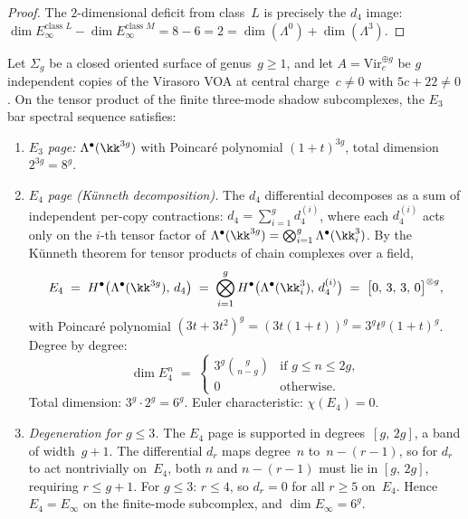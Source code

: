 \begin{proof}
The $2$-dimensional deficit from class~$L$ is precisely the $d_4$ image: $\dim E_\infty^{\text{class }L} - \dim E_\infty^{\text{class }M} = 8 - 6 = 2 = \dim(\Lambda^0) + \dim(\Lambda^3)$.
\end{proof}

\begin{corollary}
\label{cor:class-m-higher-genus}
Let $\Sigma_g$ be a closed oriented surface of genus~$g \geq 1$, and let $A = \mathrm{Vir}_c^{\oplus g}$ be $g$ independent copies of the Virasoro VOA at central charge~$c \neq 0$ with $5c + 22 \neq 0$. On the tensor product of the finite three-mode shadow subcomplexes, the $E_3$ bar spectral sequence satisfies:
\begin{enumerate}[label=\textup{(\roman*)}]
 \item \emph{$E_3$ page:} $\Lambda^\bullet(\kk^{3g})$ with Poincar\'{e} polynomial $(1+t)^{3g}$, total dimension~$2^{3g} = 8^g$.

 \item \emph{$E_4$ page (K\"{u}nneth decomposition).} The $d_4$ differential decomposes as a sum of independent per-copy contractions: $d_4 = \sum_{i=1}^g d_4^{(i)}$, where each $d_4^{(i)}$ acts only on the $i$-th tensor factor of $\Lambda^\bullet(\kk^{3g}) = \bigotimes_{i=1}^g \Lambda^\bullet(\kk^3_i)$. By the K\"{u}nneth theorem for tensor products of chain complexes over a field,
 \[
 E_4 \;=\; H^\bullet\bigl(\Lambda^\bullet(\kk^{3g}),\, d_4\bigr) \;=\; \bigotimes_{i=1}^g H^\bullet\bigl(\Lambda^\bullet(\kk^3_i),\, d_4^{(i)}\bigr) \;=\; \bigl[0,\, 3,\, 3,\, 0\bigr]^{\otimes g},
 \]
 with Poincar\'{e} polynomial $(3t + 3t^2)^g = (3t(1+t))^g = 3^g t^g (1+t)^g$. Degree by degree:
 \[
 \dim E_4^n \;=\; \begin{cases} 3^g \binom{g}{n-g} & \text{if } g \leq n \leq 2g, \\ 0 & \text{otherwise}.\end{cases}
 \]
 Total dimension: $3^g \cdot 2^g = 6^g$. Euler characteristic: $\chi(E_4) = 0$.

 \item \emph{Degeneration for $g \leq 3$.} The $E_4$ page is supported in degrees~$[g,\, 2g]$, a band of width~$g+1$. The differential $d_r$ maps degree~$n$ to~$n - (r-1)$, so for $d_r$ to act nontrivially on~$E_4$, both $n$ and $n - (r-1)$ must lie in $[g,\, 2g]$, requiring $r \leq g + 1$. For $g \leq 3$: $r \leq 4$, so $d_r = 0$ for all $r \geq 5$ on~$E_4$. Hence \(E_4=E_\infty\) on the finite-mode subcomplex, and \(\dim E_\infty=6^g\).


\end{enumerate}
\end{corollary}
